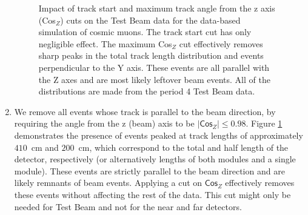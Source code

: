 \documentclass[12pt]{article}
\begin{document}
\begin{enumerate}
\begin{figure}[!ht]
\caption{Impact of track start and maximum track angle from the z axis (Cos$_Z$) cuts on the Test Beam data for the data-based simulation of cosmic muons. The track start cut has only negligible effect. The maximum Cos$_Z$ cut effectively removes sharp peaks in the total track length distribution and events perpendicular to the Y axis. These events are all parallel with the Z axes and are most likely leftover beam events. All of the distributions are made from the period 4 Test Beam data.}
\label{figCosZSelectionComparison}
\end{figure}

\item We remove all events whose track is parallel to the beam direction, by requiring the angle from the z (beam) axis to be $|\textsf{Cos}_Z|\leq 0.98$. Figure \ref{figCosZSelectionComparison} demonstrates the presence of events peaked at track lengths of approximately $410$~cm and $200$~cm, which correspond to the total and half length of the detector, respectively (or alternatively lengths of both modules and a single module). These events are strictly parallel to the beam direction and are likely remnants of beam events. Applying a cut on $\textsf{Cos}_Z$ effectively removes these events without affecting the rest of the data. This cut might only be needed for Test Beam and not for the near and far detectors.


\end{enumerate}
\end{document}
